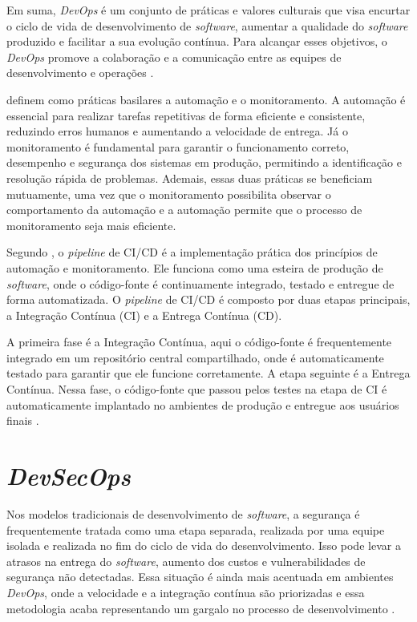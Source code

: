 Em suma, \textit{DevOps} é um conjunto de práticas e valores culturais que visa encurtar o ciclo de vida de desenvolvimento de \textit{software}, aumentar a qualidade do \textit{software} produzido e facilitar a sua evolução contínua. Para alcançar esses objetivos, o \textit{DevOps} promove a colaboração e a comunicação entre as equipes de desenvolvimento e operações \cite{Aljohani2023}.

 definem como práticas basilares a automação e o monitoramento. A automação é essencial para realizar tarefas repetitivas de forma eficiente e consistente, reduzindo erros humanos e aumentando a velocidade de entrega. 
Já o monitoramento é fundamental para garantir o funcionamento correto, desempenho e segurança dos sistemas em produção, permitindo a identificação e resolução rápida de problemas. Ademais, essas duas práticas se beneficiam mutuamente, uma vez que o monitoramento possibilita observar o comportamento da automação e a automação permite que o processo de monitoramento seja mais eficiente.

Segundo , o \textit{pipeline} de CI/CD é a implementação prática dos princípios de automação e monitoramento. Ele funciona como uma esteira de produção de \textit{software}, onde o código-fonte é continuamente integrado, testado e entregue de forma automatizada. 
O \textit{pipeline} de CI/CD é composto por duas etapas principais, a Integração Contínua (CI) e a Entrega Contínua (CD). 

A primeira fase é a Integração Contínua, aqui o código-fonte é frequentemente integrado em um repositório central compartilhado, onde é automaticamente testado para garantir que ele funcione corretamente. 
A etapa seguinte é a Entrega Contínua. Nessa fase, o código-fonte que passou pelos testes na etapa de CI é automaticamente implantado no ambientes de produção e entregue aos usuários finais \cite{Sinan2025}.

\section{\textit{DevSecOps}}

Nos modelos tradicionais de desenvolvimento de \textit{software}, a segurança é frequentemente tratada como uma etapa separada, realizada por uma equipe isolada e realizada no fim do ciclo de vida do desenvolvimento. Isso pode levar a atrasos na entrega do \textit{software}, aumento dos custos e vulnerabilidades de segurança não detectadas.
Essa situação é ainda mais acentuada em ambientes \textit{DevOps}, onde a velocidade e a integração contínua são priorizadas e essa metodologia acaba representando um gargalo no processo de desenvolvimento \cite{Sinan2025}.

